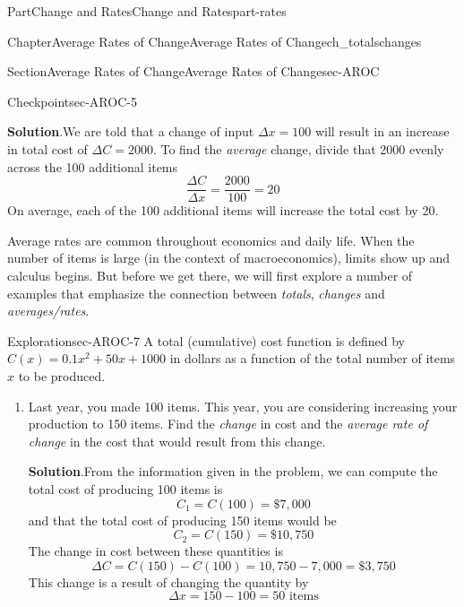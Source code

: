 \documentclass{tufte-book}
\newcommand{\blocktitlefont}{\relax}
\numberwithin{equation}{chapter}
\begin{document}
\begin{partptx}{Part}{Change and Rates}{}{Change and Rates}{}{}{part-rates}
\begin{chapterptx}{Chapter}{Average Rates of Change}{}{Average Rates of Change}{}{}{ch_totalschanges}
\begin{sectionptx}{Section}{Average Rates of Change}{}{Average Rates of Change}{}{}{sec-AROC}
\begin{inlineexercise}{Checkpoint}{}{sec-AROC-5}
\par\smallskip%
\noindent\textbf{\blocktitlefont Solution}.\hypertarget{sec-AROC-5-2}{}\quad{}We are told that a change of input \(\Delta x = 100\) will result in an increase in total cost of \(\Delta C = 2000\). To find the \emph{average} change, divide that \textdollar{}2000 evenly across the 100 additional items%
\begin{equation*}
\dfrac{\Delta C}{\Delta x} = \dfrac{2000}{100} = 20
\end{equation*}
On average, each of the 100 additional items will increase the total cost by \textdollar{}20.%
\end{inlineexercise}%
Average rates are common throughout economics and daily life. When the number of items is large (in the context of macroeconomics), limits show up and calculus begins. But before we get there, we will first explore a number of examples that emphasize the connection between \emph{totals}, \emph{changes} and \emph{averages\slash{}rates}.%
\begin{exploration}{Exploration}{}{sec-AROC-7}%
A total (cumulative) cost function is defined by \(C(x) = 0.1 x^2 + 50 x + 1000 \) in dollars as a function of the total number of items \(x\) to be produced.%
\begin{enumerate}[font=\bfseries,label=(\alph*),ref=\alph*]%
\item{}Last year, you made 100 items. This year, you are considering increasing your production to 150 items. Find the \emph{change} in cost and the \emph{average rate of change} in the cost that would result from this change.%
\par\smallskip%
\noindent\textbf{\blocktitlefont Solution}.\hypertarget{sec-AROC-7-2-2}{}\quad{}From the information given in the problem, we can compute the total cost of producing 100 items is%
\begin{equation*}
C_1 = C(100) = \$ 7, 000
\end{equation*}
and that the total cost of producing 150 items would be%
\begin{equation*}
C_2 = C(150) = \$ 10, 750
\end{equation*}
The change in cost between these quantities is%
\begin{equation*}
\Delta C = C(150) - C(100) = 10,750 - 7,000 = \$ 3,750
\end{equation*}
This change is a result of changing the quantity by%
\begin{equation*}
\Delta x = 150 - 100 = 50 \text{ items}
\end{equation*}

\end{enumerate}
\end{exploration}
\end{sectionptx}
\end{chapterptx}
\end{partptx}
\end{document}

